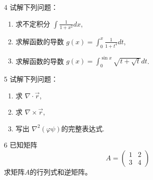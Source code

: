 \documentclass[11pt]{article}
\begin{document}
\vspace{0.5cm}

\begin{hwproblem}{4}
  试解下列问题：
  \begin{enumerate}
    \item 求不定积分 $\int \frac{1}{1+x^2} dx$,
    \item 求解函数的导数 $g(x)=\int_0^x \frac{1}{1+t^4} d t$,
    \item 求解函数的导数 $g(x)=\int_0^{\sin x} \sqrt{t+\sqrt{t}} d t$.
  \end{enumerate}
\end{hwproblem}

\vspace{0.5cm}

\begin{hwproblem}{5}
  试解下列问题：
  \begin{enumerate}
    \item 求 $\nabla \cdot \vec{r}$,
    \item 求 $\nabla \times \vec{r}$,
    \item 写出 $\nabla^2(\varphi \psi)$的完整表达式.
  \end{enumerate}
\end{hwproblem}

\begin{hwproblem}{6}
  已知矩阵
  \[
    A = \begin{pmatrix}
      1 & 2 \\
      3 & 4
    \end{pmatrix}
  \]
  求矩阵$A$的行列式和逆矩阵。
\end{hwproblem}
\vspace{0.5cm}

\end{document}
